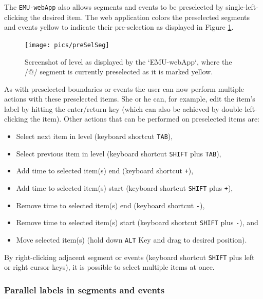 \documentclass[]{book}
\providecommand{\tightlist}{%
  \setlength{\itemsep}{0pt}\setlength{\parskip}{0pt}}
\begin{document}
The \texttt{EMU-webApp} also allows segments and events to be preselected by single-left-clicking the desired item. The web application colors the preselected segments and events yellow to indicate their pre-selection as displayed in Figure \ref{fig:webApp-preSelSeg}.

\begin{figure}

{\centering \texttt{[image: pics/preSelSeg]} 

}

\caption{Screenshot of level as displayed by the `EMU-webApp`, where the /@/ segment is currently preselected as it is marked yellow.}\label{fig:webApp-preSelSeg}
\end{figure}

As with preselected boundaries or events the user can now perform multiple actions with these preselected items. She or he can, for example, edit the item's label by hitting the enter/return key (which can also be achieved by double-left-clicking the item). Other actions that can be performed on preselected items are:

\begin{itemize}
\tightlist
\item
  Select next item in level (keyboard shortcut \texttt{TAB}),
\item
  Select previous item in level (keyboard shortcut \texttt{SHIFT} plus \texttt{TAB}),
\item
  Add time to selected item(s) end (keyboard shortcut \texttt{+}),
\item
  Add time to selected item(s) start (keyboard shortcut \texttt{SHIFT} plus \texttt{+}),
\item
  Remove time to selected item(s) end (keyboard shortcut \texttt{-}),
\item
  Remove time to selected item(s) start (keyboard shortcut \texttt{SHIFT} plus \texttt{-}), and
\item
  Move selected item(s) (hold down \texttt{ALT} Key and drag to desired position).
\end{itemize}

By right-clicking adjacent segment or events (keyboard shortcut \texttt{SHIFT} plus left or right cursor keys), it is possible to select multiple items at once.

\hypertarget{parallel-labels-in-segments-and-events}{%
\subsubsection{Parallel labels in segments and events}\label{parallel-labels-in-segments-and-events}}
\end{document}
